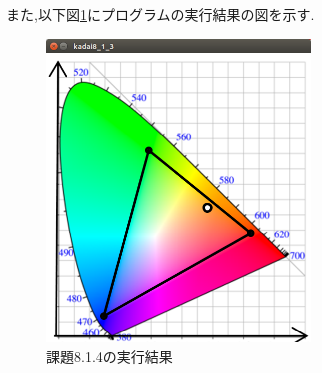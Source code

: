 \documentclass{jarticle}
\begin{document}


また,以下図\ref{fig:kadai8-1-4}にプログラムの実行結果の図を示す.

\begin{figure}[H]
\begin{center}
\includegraphics[width=7.0cm]{images/kadai8-1-4.png}
\caption{課題8.1.4の実行結果}
\label{fig:kadai8-1-4}
\end{center}
\end{figure}
\end{document}
